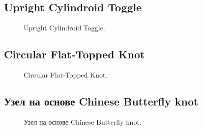 \subsection{Upright Cylindroid Toggle}

\begin{figure}[H]\centering
	\begin{minipage}{1\linewidth}
		\begin{center}
			\tcbox[enhanced jigsaw,colframe=black,opacityframe=0.5,opacityback=0.5]
			{\centering{}}
		\end{center}
	\end{minipage}
\caption{Upright Cylindroid Toggle.}
\label{ris:Upright_Cylindroid_Toggle}
\end{figure}

\subsection{Circular Flat-Topped Knot}

\begin{figure}[H]\centering
	\begin{minipage}{1\linewidth}
		\begin{center}
			\tcbox[enhanced jigsaw,colframe=black,opacityframe=0.5,opacityback=0.5]
			{\centering{}}
		\end{center}
	\end{minipage}
\caption{Circular Flat-Topped Knot.}
\label{ris:Circular_Flat-Topped_Knot}
\end{figure}

\subsection{Узел на основе Chinese Butterfly knot}


\begin{figure}[H]\centering
	\begin{minipage}{1\linewidth}
		\begin{center}
			\tcbox[enhanced jigsaw,colframe=black,opacityframe=0.5,opacityback=0.5]
			{\centering{}}
		\end{center}
	\end{minipage}
\caption{Узел на основе Chinese Butterfly knot.}
\label{ris:Chinese_Butterfly_knot_based}
\end{figure}

